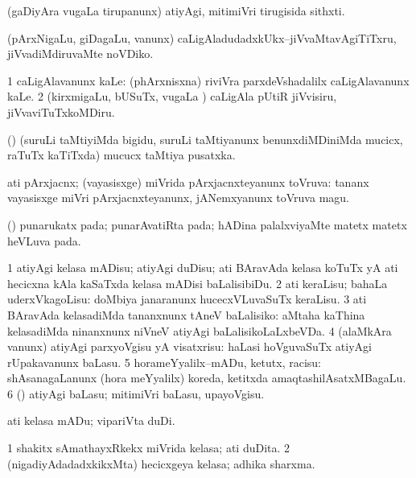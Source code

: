 \bentry
{}
\gl{\nA}
\bmng
(gaDiyAra \mo vugaLa tirupanunx) atiyAgi, mitimiVri tirugisida sithxti. 
\emng
\eentry

\bentry
{}
\gl{\sakirx}
\bmng
(pArxNigaLu, giDagaLu, \mo vanunx) caLigAladudadxkUkx--jiVvaMtavAgiTiTxru, jiVvadiMdiruvaMte noVDiko. 
\emng

\noindent
\gl{\akirx}
\bmng
\bnum
\num{1} caLigAlavanunx kaLe:  (phArxnisxna) riviVra parxdeVshadalilx caLigAlavanunx kaLe. 
\num{2} (kirxmigaLu, bUSuTx, \mo vugaLa \vi) caLigAla pUtiR jiVvisiru, jiVvaviTuTxkoMDiru. 
\enum
\emng
\eentry

\bentry
{}
\gl{\nA}
\bmng
(\ame) (suruLi taMtiyiMda bigidu, suruLi taMtiyanunx benunxdiMDiniMda mucicx, raTuTx kaTiTxda) mucucx taMtiya pusatxka. 
\emng
\eentry

\bentry
{}
\gl{\gu}
\bmng
ati pArxjacnx; (vayasisxge) miVrida pArxjacnxteyanunx toVruva:  tananx vayasisxge miVri pArxjacnxteyanunx, jANemxyanunx toVruva magu. 
\emng
\eentry

\bentry
{}
\gl{\nA}
\bmng
(\ame) punarukatx pada; punarAvatiRta pada; hADina palalxviyaMte matetx matetx heVLuva pada. 
\emng
\eentry

\bentry
{}
\gl{\sakirx}
\bmng
\bnum
\num{1} atiyAgi kelasa mADisu; atiyAgi duDisu; ati BAravAda kelasa koTuTx yA ati hecicxna kAla kaSaTxda kelasa mADisi baLalisibiDu. 
\num{2} ati keraLisu; bahaLa uderxVkagoLisu:  doMbiya janaranunx hucecxVLuvaSuTx keraLisu. 
\num{3} ati BAravAda kelasadiMda tananxnunx tAneV baLalisiko:  aMtaha kaThina kelasadiMda ninanxnunx niVneV atiyAgi baLalisikoLaLxbeVDa. 
\num{4} (alaMkAra \mo vanunx) atiyAgi parxyoVgisu yA visatxrisu:  haLasi hoVguvaSuTx atiyAgi rUpakavanunx baLasu. 
\num{5} horameYyalilx--mADu, ketutx, racisu:  shAsanagaLanunx (hora meYyalilx) koreda, ketitxda amaqtashilAsatxMBagaLu. 
\num{6} (\rUpa) atiyAgi baLasu; mitimiVri baLasu, upayoVgisu. 
\enum
\emng

\noindent
\gl{\akirx}
\bmng
ati kelasa mADu; vipariVta duDi. 
\emng
\eentry

\bentry
{}
\gl{\nA}
\bmng
\bnum
\num{1} shakitx sAmathayxRkekx miVrida kelasa; ati duDita. 
\num{2} (nigadiyAdadadxkikxMta) hecicxgeya kelasa; adhika sharxma. 
\enum
\emng
\eentry

